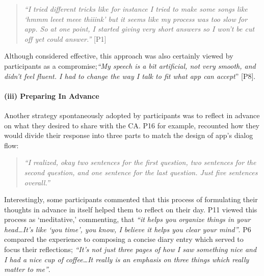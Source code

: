                     \begin{quote}
                    \vspace{2mm}
                        \textit{``I tried different tricks like for instance I tried to make some songs like `hmmm leeet meee thiiink' but it seems like my process was too slow for \acl{app}. So at one point, I started giving very short answers so I won’t be cut off yet could answer.''} [P1]
                    \vspace{2mm}
                    \end{quote}             
                
                Although considered effective, this approach was also certainly viewed by participants as a compromise;\textit{``My speech is a bit artificial, not very smooth, and didn't feel fluent. I had to change the way I talk to fit what \acl{app} can accept}'' [P8].
                    
            \paragraph{(iii) Preparing In Advance}
                    
                Another strategy spontaneously adopted by participants was to reflect in advance on what they desired to share with the \ac{CA}. P16 for example, recounted how they would divide their response into three parts to match the design of \acl{app}'s dialog flow:  
                
                    \begin{quote}
                    \vspace{2mm}
                        \textit{``I realized, okay two sentences for the first question, two sentences for the second question, and one sentence for the last question. Just five sentences overall.''} %
                    \vspace{2mm}
                    \end{quote}   
                
                Interestingly, some participants commented that this process of formulating their thoughts in advance in itself helped them to reflect on their day. P11 viewed this process as `meditative,' commenting, that \textit{``it helps you organize things in your head\ldots It's like `you time', you know, I believe it helps you clear your mind''}. P6 compared the experience to composing a concise diary entry which served to focus their reflections; \textit{``It's not just three pages of how I saw something nice and I had a nice cup of coffee\ldots It really is an emphasis on three things which really matter to me''}.
                
